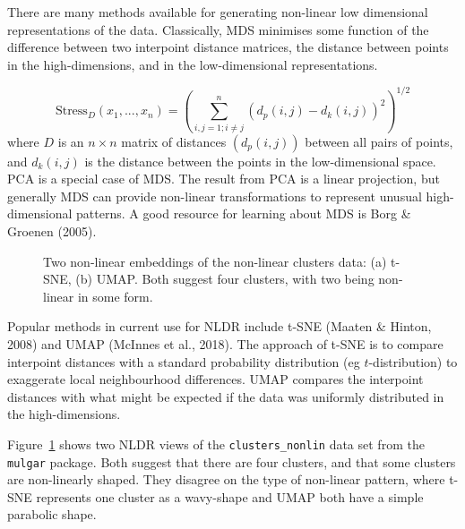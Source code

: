 \documentclass[
  letterpaper,
]{krantz}
\begin{document}
There are many methods available for generating non-linear low
dimensional representations of the data. Classically, MDS minimises some
function of the difference between two interpoint distance matrices, the
distance between points in the high-dimensions, and in the
low-dimensional representations.

\[
\mbox{Stress}_D(x_1, ..., x_n) = \left(\sum_{i, j=1; i\neq j}^n (d_p(i,j) - d_k(i,j))^2\right)^{1/2}
\] where \(D\) is an \(n\times n\) matrix of distances \((d_p(i,j))\)
between all pairs of points, and \(d_k(i,j)\) is the distance between
the points in the low-dimensional space. PCA is a special case of MDS.
The result from PCA is a linear projection, but generally MDS can
provide non-linear transformations to represent unusual high-dimensional
patterns. A good resource for learning about MDS is Borg \& Groenen
(2005).

 

\begin{figure}


\caption{\label{fig-nldr-clusters}Two non-linear embeddings of the
non-linear clusters data: (a) t-SNE, (b) UMAP. Both suggest four
clusters, with two being non-linear in some form.}

\end{figure}%

Popular methods in current use for NLDR include t-SNE (Maaten \& Hinton,
2008) and UMAP (McInnes et al., 2018). The approach of t-SNE is to
compare interpoint distances with a standard probability distribution
(eg \(t\)-distribution) to exaggerate local neighbourhood differences.
UMAP compares the interpoint distances with what might be expected if
the data was uniformly distributed in the high-dimensions.

Figure~\ref{fig-nldr-clusters} shows two NLDR views of the
\texttt{clusters\_nonlin} data set from the \texttt{mulgar} package.
Both suggest that there are four clusters, and that some clusters are
non-linearly shaped. They disagree on the type of non-linear pattern,
where t-SNE represents one cluster as a wavy-shape and UMAP both have a
simple parabolic shape.
\end{document}

